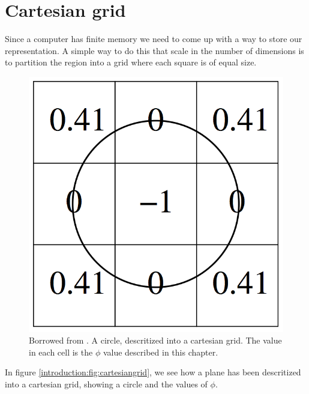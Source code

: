 

\section*{Cartesian grid}

Since a computer has finite memory we need to come up with a way to
store our representation. A simple way to do this that scale in the
number of dimensions is to partition the region into a grid where each
square is of equal size.

\begin{figure}[htb] \centering
  \includegraphics[scale=0.3]{imgs/cartesiangrid.png}
  \caption{Borrowed from . A circle, descritized into a
cartesian grid. The value in each cell is the $\phi$ value described
in this chapter.}
  \label{introduction:fig:cartesiangrid}
\end{figure}

In figure \vref{introduction:fig:cartesiangrid}, we see how a plane
has been descritized into a cartesian grid, showing a circle and the
values of $\phi$.

